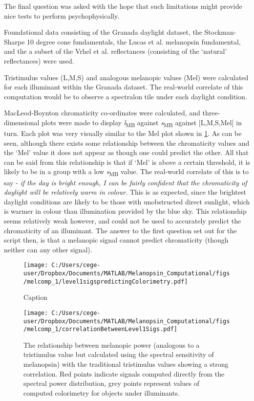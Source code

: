 \documentclass{article}
\begin{document}
The final question was asked with the hope that such limitations might provide nice tests to perform psychophysically. 

Foundational data consisting of the Granada daylight dataset, the Stockman-Sharpe 10 degree cone fundamentals, the Lucas et al. melanopsin fundamental, and the a subset of the Vrhel et al. reflectances (consisting of the `natural' reflectances) were used.

Tristimulus values (L,M,S) and analogous melanopic values (Mel) were calculated for each illuminant within the Granada dataset. The real-world correlate of this computation would be to observe a spectralon tile under each daylight condition.

MacLeod-Boynton chromaticity co-ordinates were calculated, and three-dimensional plots were made to display \textit{l}\textsubscript{MB} against \textit{s}\textsubscript{MB} against [L,M,S,Mel] in turn. Each plot was very visually similar to the Mel plot shown in \ref{fig:l1}. As can be seen, although there exists some relationship between the chromaticity values and the `Mel' value it does not appear as though one could predict the other. All that can be said from this relationship is that if `Mel' is above a certain threshold, it is likely to be in a group with a low \textit{s}\textsubscript{MB} value. The real-world correlate of this is to say - \textit{if the day is bright enough, I can be fairly confident that the chromaticity of daylight will be relatively warm in colour.} This is as expected, since the brightest daylight conditions are likely to be those with unobstructed direct sunlight, which is warmer in colour than illumination provided by the blue sky. This relationship seems relatively weak however, and could not be used to accurately predict the chromaticity of an illuminant. The answer to the first question set out for the script then, is that a melanopic signal cannot predict chromaticity (though neither can any other signal).

\begin{figure}[ht]
    \centering
    \texttt{[image: C:/Users/cege-user/Dropbox/Documents/MATLAB/Melanopsin\_Computational/figs/melcomp\_1/level1sigspredictingColorimetry.pdf]}
    \caption{Caption}
    \label{fig:l1}
\end{figure} 

\begin{figure}[ht]
    \centering
    \texttt{[image: C:/Users/cege-user/Dropbox/Documents/MATLAB/Melanopsin\_Computational/figs/melcomp\_1/correlationBetweenLevel1Sigs.pdf]}
    \caption{The relationship between melanopic power (analogous to a tristimulus value but calculated using the spectral sensitivity of melanopsin) with the traditional tristimulus values showing a strong correlation. Red points indicate signals computed directly from the spectral power distribution, grey points represent values of computed colorimetry for objects under illuminants.}
    \label{fig:tristimCorrelation}
\end{figure} 
\end{document}
